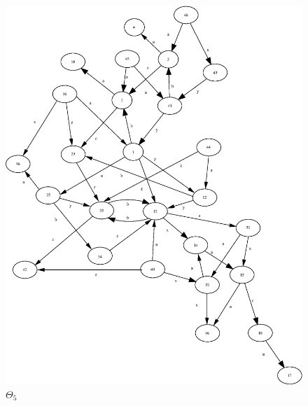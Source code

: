\documentclass[a4paper,12pt]{article}
\numberwithin{equation}{section}
\numberwithin{figure}{section}
\begin{document}
\begin{figure}
\begin{center}
\includegraphics[scale=0.8]{ex_K_f5_neato.eps}
\caption{$\Theta_5$}
\label{fig:K_f5}
\end{center}
\end{figure}
\end{document}
